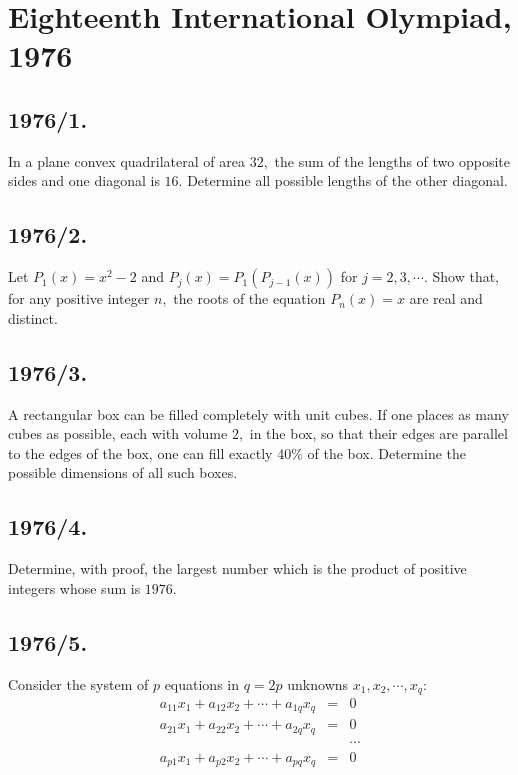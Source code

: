 \documentclass[12pt,thmsa]{article}
\begin{document}
\section{Eighteenth International Olympiad, 1976}

\subsection{1976/1.}

In a plane convex quadrilateral of area $32,$ the sum of the lengths of two
opposite sides and one diagonal is $16.$ Determine all possible lengths of
the other diagonal.

\subsection{1976/2. }

Let $P_{1}(x)=x^{2}-2$ and $P_{j}(x)=P_{1}(P_{j-1}(x))$ for $j=2,3,\cdots $.
Show that, for any positive integer $n,$ the roots of the equation $%
P_{n}(x)=x$ are real and distinct.

\subsection{1976/3. }

A rectangular box can be filled completely with unit cubes. If one places as
many cubes as possible, each with volume $2,$ in the box, so that their
edges are parallel to the edges of the box, one can fill exactly $40\%$ of
the box. Determine the possible dimensions of all such boxes.

\subsection{1976/4. }

Determine, with proof, the largest number which is the product of positive
integers whose sum is $1976.$

\subsection{1976/5. }

Consider the system of $p$ equations in $q=2p$ unknowns $x_{1},x_{2},\cdots
,x_{q}:$%
\begin{eqnarray*}
a_{11}x_{1}+a_{12}x_{2}+\cdots +a_{1q}x_{q} &=&0 \\
a_{21}x_{1}+a_{22}x_{2}+\cdots +a_{2q}x_{q} &=&0 \\
&&\cdots  \\
a_{p1}x_{1}+a_{p2}x_{2}+\cdots +a_{pq}x_{q} &=&0
\end{eqnarray*}
\end{document}
